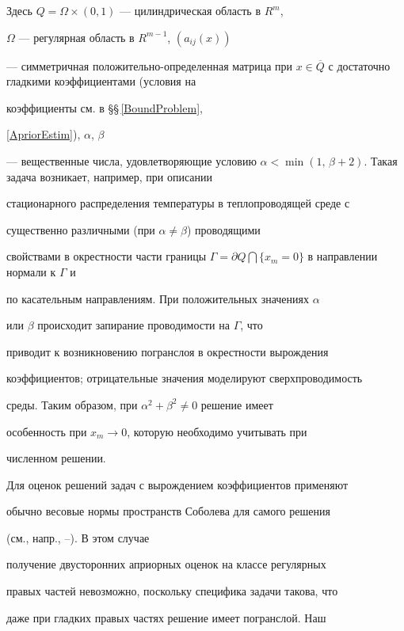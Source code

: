 Здесь $Q=\Omega \times (0,1)$ --- цилиндрическая область в $R^m$,


$\Omega$ --- регулярная область в $R^{m-1}$, $(a_{ij}(x))$


--- симметричная положительно-определенная матрица при $x \in


\overline{Q}$ с достаточно гладкими коэффициентами (условия на


коэффициенты см. в \S\S\,\ref{BoundProblem},


\ref{ApriorEstim}), $\alpha$, $\beta$


--- вещественные числа, удовлетворяющие условию $\alpha <


\min(1,\,\beta+2)$. Такая задача возникает, например, при описании


стационарного распределения температуры в теплопроводящей среде с


существенно различными (при $\alpha \ne \beta$) проводящими


свойствами в окрестности части границы $\Gamma =


\partial Q \bigcap \{x_m=0\}$ в направлении нормали к $\Gamma$ и


по касательным направлениям. При положительных значениях $\alpha$


или $\beta$ происходит запирание проводимости на $\Gamma$, что


приводит к возникновению погранслоя в окрестности вырождения


коэффициентов; отрицательные значения моделируют сверхпроводимость


среды. Таким образом, при $\alpha^2+\beta^2 \ne 0$ решение имеет


особенность при $x_m \to 0$, которую необходимо учитывать при


численном решении.





Для оценок решений задач с вырождением коэффициентов применяют


обычно весовые нормы пространств Соболева для самого решения


(см., напр., \cite{LizNik-Var}--\cite{Kidiraliev}). В этом случае


получение двусторонних априорных оценок на классе регулярных


правых частей невозможно, поскольку специфика задачи такова, что


даже при гладких правых частях решение имеет погранслой. Наш


